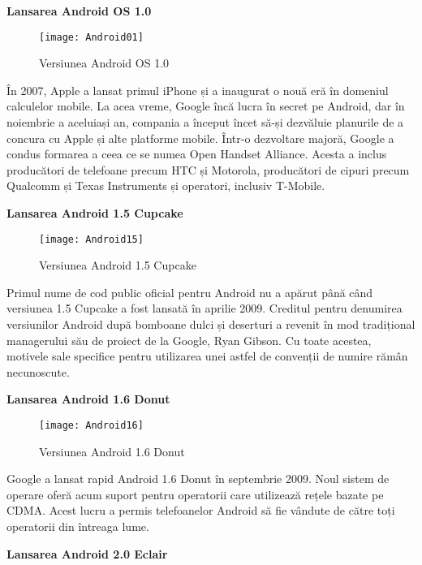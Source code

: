 \documentclass[a4paper]{article}
\begin{document}
\vspace{5mm}
	\begin{center}
\large\textbf{Lansarea Android OS 1.0}
\end{center}

\begin{figure}[h]
	\centering
	\texttt{[image: Android01]} \\
	\caption{Versiunea Android OS 1.0}
	\label{fig:Android01}
\end{figure}
\par
În 2007, Apple a lansat primul iPhone și a inaugurat o nouă eră în domeniul calculelor mobile. La acea vreme, Google încă lucra în secret pe Android, dar în noiembrie a aceluiași an, compania a început încet să-și dezvăluie planurile de a concura cu Apple și alte platforme mobile. Într-o dezvoltare majoră, Google a condus formarea a ceea ce se numea Open Handset Alliance. Acesta a inclus producători de telefoane precum HTC și Motorola, producători de cipuri precum Qualcomm și Texas Instruments și operatori, inclusiv T-Mobile.
\par

\begin{center}
	\large\textbf{Lansarea Android 1.5 Cupcake}
\end{center}

\begin{figure}[h]
	\centering
	\texttt{[image: Android15]} \\
	\caption{Versiunea Android 1.5 Cupcake}
	\label{fig:Android15}
\end{figure}
\par
Primul nume de cod public oficial pentru Android nu a apărut până când versiunea 1.5 Cupcake a fost lansată în aprilie 2009. Creditul pentru denumirea versiunilor Android după bomboane dulci și deserturi a revenit în mod tradițional managerului său de proiect de la Google, Ryan Gibson. Cu toate acestea, motivele sale specifice pentru utilizarea unei astfel de convenții de numire rămân necunoscute.
\clearpage
\begin{center}
	\large\textbf{Lansarea Android 1.6 Donut}
\end{center}

\begin{figure}[h]
	\centering
	\texttt{[image: Android16]} \\
	\caption{Versiunea Android 1.6 Donut}
	\label{fig:Android16}
\end{figure}
\par Google a lansat rapid Android 1.6 Donut în septembrie 2009. Noul sistem de operare oferă acum suport pentru operatorii care utilizează rețele bazate pe CDMA. Acest lucru a permis telefoanelor Android să fie vândute de către toți operatorii din întreaga lume.
\begin{center}
	\large\textbf{Lansarea Android 2.0 Eclair}
\end{center}
\end{document}
